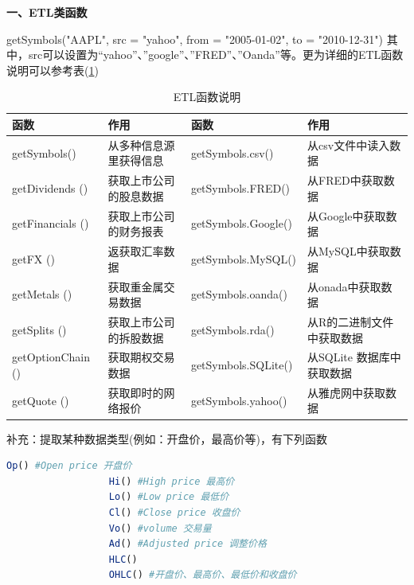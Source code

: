             \textbf{一、ETL类函数}
            \par
            getSymbols("AAPL", src = "yahoo", from = "2005-01-02", to = "2010-12-31")
            其中，src可以设置为“yahoo”、”google”、”FRED”、”Oanda”等。更为详细的ETL函数说明可以参考表(\ref{tab:ETL函数说明})
            \begin{table}[H]
            \centering
            \caption{ETL函数说明}
            \label{tab:ETL函数说明}
                \begin{tabularx}{\textwidth}{lXlX}
                \toprule
            函数 & 作用&函数 & 作用\\\midrule
            getSymbols()   &从多种信息源里获得信息& getSymbols.csv()  &从csv文件中读入数据  \\
            getDividends () &获取上市公司的股息数据& getSymbols.FRED() &从FRED中获取数据\\
            getFinancials () &获取上市公司的财务报表& getSymbols.Google() &从Google中获取数据\\
            getFX ()   &返获取汇率数据& getSymbols.MySQL()   &从MySQL中获取数据\\
            getMetals ()   &获取重金属交易数据 & getSymbols.oanda()  &从onada中获取数据\\
            getSplits ()  &获取上市公司的拆股数据 & getSymbols.rda()  &从R的二进制文件中获取数据\\
            getOptionChain () &获取期权交易数据& getSymbols.SQLite()   &从SQLite 数据库中获取数据\\
            getQuote () &获取即时的网络报价& getSymbols.yahoo()   &从雅虎网中获取数据\\
                \bottomrule
            \end{tabularx}
            \end{table}
            补充：提取某种数据类型(例如：开盘价，最高价等)，有下列函数
            \begin{lstlisting}[language = R]
                  Op() #Open price 开盘价
                  Hi() #High price 最高价
                  Lo() #Low price 最低价
                  Cl() #Close price 收盘价
                  Vo() #volume 交易量
                  Ad() #Adjusted price 调整价格
                  HLC()
                  OHLC() #开盘价、最高价、最低价和收盘价
            \end{lstlisting}

